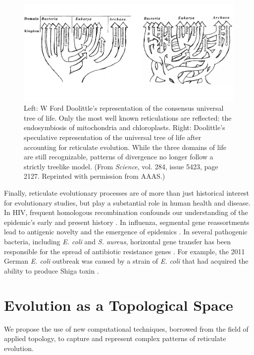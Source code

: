 \begin{figure}
\centering
\includegraphics[]{./fig/introduction/doolittle_trees.pdf}
\caption[Ford Doolittle's Reticulate Tree of Life]{Left: W Ford Doolittle's representation of the consensus universal tree of life. Only the most well known reticulations are reflected: the endosymbiosis of mitochondria and chloroplasts. Right: Doolittle's speculative representation of the universal tree of life after accounting for reticulate evolution. While the three domains of life are still recognizable, patterns of divergence no longer follow a strictly treelike model. (From \emph{Science}, vol. 284, issue 5423, page 2127. Reprinted with permission from AAAS.)}
\label{fig:doolittle_tree}
\end{figure}

Finally, reticulate evolutionary processes are of more than just historical interest for evolutionary studies, but play a substantial role in human health and disease.
In HIV, frequent homologous recombination confounds our understanding of the epidemic's early and present history \cite{Burke:1997ep}.
In influenza, segmental gene reassortments lead to antigenic novelty and the emergence of epidemics \cite{Nelson:2007bc}.
In several pathogenic bacteria, including \emph{E. coli} and \emph{S. aureus}, horizontal gene transfer has been responsible for the spread of antibiotic resistance genes \cite{Alekshun:2007bq,Davies:2010dv}.
For example, the 2011 German \emph{E. coli} outbreak was caused by a strain of \emph{E. coli} that had acquired the ability to produce Shiga toxin \cite{Rohde:2011ju}.

\section{Evolution as a Topological Space}

We propose the use of new computational techniques, borrowed from the field of applied topology, to capture and represent complex patterns of reticulate evolution.

